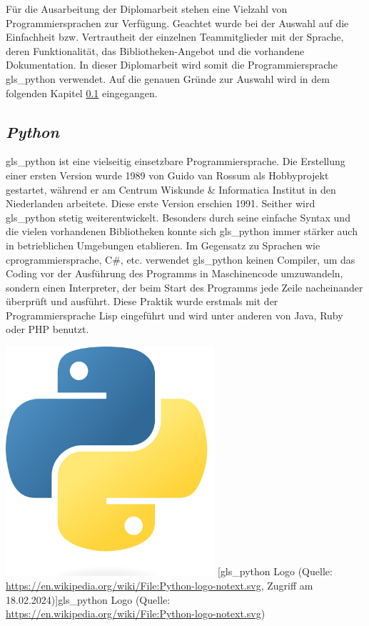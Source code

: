 Für die Ausarbeitung der Diplomarbeit stehen eine Vielzahl von Programmiersprachen zur Verfügung. Geachtet wurde bei der Auswahl auf die Einfachheit bzw. Vertrautheit der einzelnen Teammitglieder mit der Sprache, deren Funktionalität, das Bibliotheken-Angebot und die vorhandene Dokumentation. In dieser Diplomarbeit wird somit die Programmiersprache \gls{gls_python} verwendet. Auf die genauen Gründe zur Auswahl wird in dem folgenden Kapitel \ref{python_kapitel} eingegangen.

\subsection{\textit{Python}}\label{python_kapitel}
\begin{minipage}{0.6\textwidth}
	\gls{gls_python} ist eine vielseitig einsetzbare Programmiersprache. Die Erstellung einer ersten Version wurde 1989 von Guido van Rossum als Hobbyprojekt gestartet, während er am Centrum Wiskunde \& Informatica Institut in den Niederlanden arbeitete. Diese erste Version erschien 1991. Seither wird \gls{gls_python} stetig weiterentwickelt. Besonders durch seine einfache Syntax und die vielen vorhandenen Bibliotheken konnte sich \gls{gls_python} immer stärker auch in betrieblichen Umgebungen etablieren. Im Gegensatz zu Sprachen wie \gls{cprogrammiersprache}, C\#, etc. verwendet \gls{gls_python} keinen Compiler, um das Coding vor der Ausführung des Programms in Maschinencode umzuwandeln, sondern einen Interpreter, der beim Start des Programms jede Zeile nacheinander überprüft und ausführt. Diese Praktik wurde erstmals mit der Programmiersprache Lisp eingeführt und wird unter anderen von Java, Ruby oder PHP benutzt. 
	\cite[vgl.][]{Python_Software_Foundation:o.J., Pramanick_gfg:2019, Ryte:2021}
\end{minipage}%
\hfill
\begin{minipage}{0.37\textwidth}
	\centering	
	\includegraphics[width=0.58\textwidth]{Bilder/Python_logo}
	[\gls{gls_python} Logo (Quelle: \url{https://en.wikipedia.org/wiki/File:Python-logo-notext.svg}, Zugriff am 18.02.2024)]{\gls{gls_python} Logo (Quelle:\\
		\url{https://en.wikipedia.org/wiki/File:Python-logo-notext.svg}) \label{fig:python_logo}}
\end{minipage}
\vspace{1ex}

